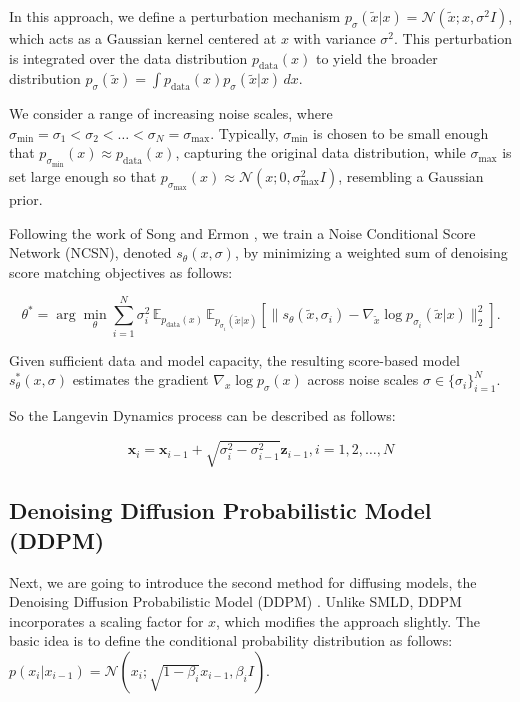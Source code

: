 In this approach, we define a perturbation mechanism \( p_\sigma(\tilde{x} | x) = \mathcal{N}(\tilde{x}; x, \sigma^2 I) \), which acts as a Gaussian kernel centered at \( x \) with variance \( \sigma^2 \). This perturbation is integrated over the data distribution \( p_{\text{data}}(x) \) to yield the broader distribution \( p_\sigma(\tilde{x}) = \int p_{\text{data}}(x) p_\sigma(\tilde{x} | x) \, dx \). 

We consider a range of increasing noise scales, where \( \sigma_{\min} = \sigma_1 < \sigma_2 < \dots < \sigma_N = \sigma_{\max} \). Typically, \( \sigma_{\min} \) is chosen to be small enough that \( p_{\sigma_{\min}}(x) \approx p_{\text{data}}(x) \), capturing the original data distribution, while \( \sigma_{\max} \) is set large enough so that \( p_{\sigma_{\max}}(x) \approx \mathcal{N}(x; 0, \sigma_{\max}^2 I) \), resembling a Gaussian prior.

Following the work of Song and Ermon \cite{song_generative_2020}, we train a Noise Conditional Score Network (NCSN), denoted \( s_\theta(x, \sigma) \), by minimizing a weighted sum of denoising score matching objectives as follows:

\begin{equation}
\theta^* = \arg \min_{\theta} \sum_{i=1}^{N} \sigma_i^2 \, \mathbb{E}_{p_{\text{data}}(x)} \, \mathbb{E}_{p_{\sigma_i}(\tilde{x} | x)} \left[ \| s_\theta(\tilde{x}, \sigma_i) - \nabla_{\tilde{x}} \log p_{\sigma_i}(\tilde{x} | x) \|_2^2 \right].
\end{equation}

Given sufficient data and model capacity, the resulting score-based model \( s_\theta^*(x, \sigma) \) estimates the gradient \( \nabla_x \log p_{\sigma}(x) \) across noise scales \( \sigma \in \{\sigma_i\}_{i=1}^{N} \).

So the Langevin Dynamics process can be described as follows:

\begin{equation}
\mathbf{x}_i = \mathbf{x}_{i-1} + \sqrt{\sigma_{i}^2 - \sigma_{i-1}^2} \mathbf{z}_{i-1} , i = 1, 2, \dots, N
\end{equation}



\subsection{ Denoising Diffusion Probabilistic Model (DDPM)}
Next, we are going to introduce the second method for diffusing models, the Denoising Diffusion Probabilistic Model (DDPM) \cite{DDPM_2020}. Unlike SMLD, DDPM incorporates a scaling factor for \( x \), which modifies the approach slightly. The basic idea is to define the conditional probability distribution as follows: \( p(x_i | x_{i-1}) = \mathcal{N} \left( x_i ; \sqrt{1 - \beta_i} x_{i-1}, \beta_i I \right) \).

